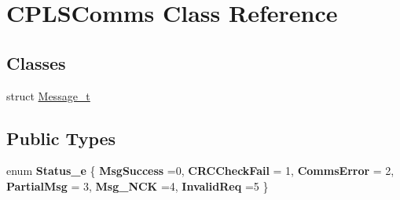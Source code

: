 \hypertarget{class_c_p_l_s_comms}{}\section{C\+P\+L\+S\+Comms Class Reference}
\label{class_c_p_l_s_comms}
\subsection*{Classes}
\begin{DoxyCompactItemize}
\item 
struct \mbox{\hyperlink{struct_c_p_l_s_comms_1_1_message__t}{Message\+\_\+t}}
\end{DoxyCompactItemize}
\subsection*{Public Types}
\begin{DoxyCompactItemize}
\item 
\mbox{\label{class_c_p_l_s_comms_a765bc36363f75f4faf4fd2b41d440159}} 
enum {\bfseries Status\+\_\+e} \{ \newline
{\bfseries Msg\+Success} =0, 
{\bfseries C\+R\+C\+Check\+Fail} = 1, 
{\bfseries Comms\+Error} = 2, 
{\bfseries Partial\+Msg} = 3, 
\newline
{\bfseries Msg\+\_\+\+N\+CK} =4, 
{\bfseries Invalid\+Req} =5
 \}
\end{DoxyCompactItemize}
